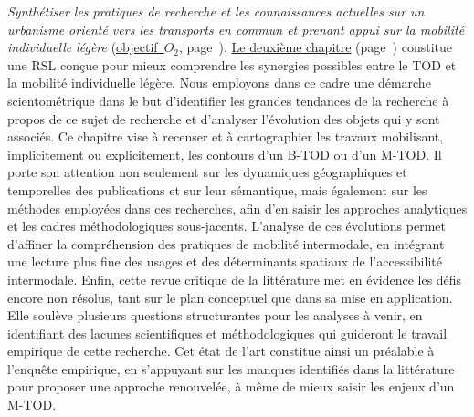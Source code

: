 \textsl{Synthétiser les pratiques de recherche et les connaissances actuelles sur un urbanisme orienté vers les transports en commun et prenant appui sur la mobilité individuelle légère} (\hyperref[objectif-2]{objectif~\(O_2\)}, page~\pageref{objectif-2}). \hyperref[chap2:titre]{Le deuxième chapitre} (page~\pageref{chap2:titre}) constitue une \acrfull{RSL} conçue pour mieux comprendre les synergies possibles entre le \acrshort{TOD} et la mobilité individuelle légère. Nous employons dans ce cadre une démarche scientométrique dans le but d’identifier les grandes tendances de la recherche à propos de ce sujet de recherche et d’analyser l’évolution des objets qui y sont associés. Ce chapitre vise à recenser et à cartographier les travaux mobilisant, implicitement ou explicitement, les contours d’un \acrshort{B-TOD} ou d’un \acrshort{M-TOD}. Il porte son attention non seulement sur les dynamiques géographiques et temporelles des publications et sur leur sémantique, mais également sur les méthodes employées dans ces recherches, afin d’en saisir les approches analytiques et les cadres méthodologiques sous-jacents. L’analyse de ces évolutions permet d’affiner la compréhension des pratiques de mobilité intermodale, en intégrant une lecture plus fine des usages et des déterminants spatiaux de l’accessibilité intermodale. Enfin, cette revue critique de la littérature met en évidence les défis encore non résolus, tant sur le plan conceptuel que dans sa mise en application. Elle soulève plusieurs questions structurantes pour les analyses à venir, en identifiant des lacunes scientifiques et méthodologiques qui guideront le travail empirique de cette recherche. Cet état de l’art constitue ainsi un préalable à l'enquête empirique, en s’appuyant sur les manques identifiés dans la littérature pour proposer une approche renouvelée, à même de mieux saisir les enjeux d'un \acrshort{M-TOD}.%


